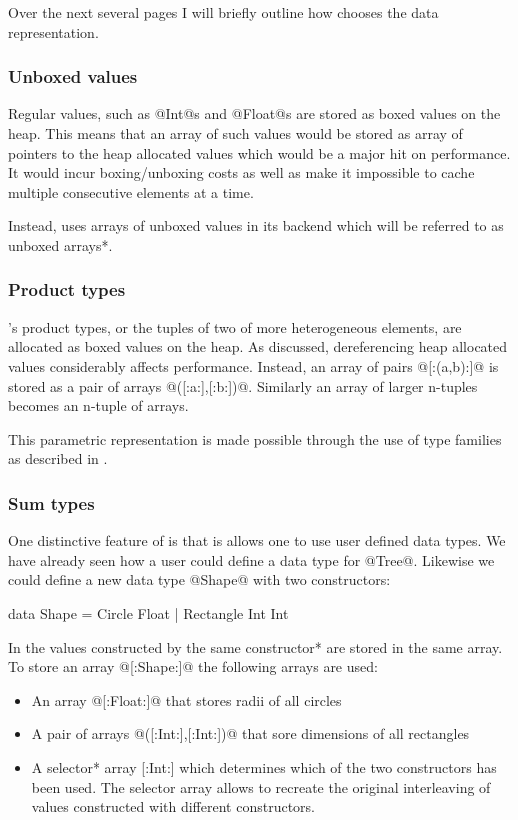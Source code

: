\documentclass[preamble.tex]{subfiles}
\begin{document}
Over the next several pages I will briefly outline how \DPH chooses the data representation.


\subsubsection{Unboxed values}
\iboxing{}

Regular \Haskell values, such as @Int@s and @Float@s are stored as boxed values on the heap. This means that an array of such values would be stored as array of pointers to the heap allocated values which would be a major hit on performance. It would incur boxing/unboxing costs as well as make it impossible to cache multiple consecutive elements at a time.

Instead, \DPH uses arrays of unboxed values in its backend which will be referred to as \*unboxed arrays*.


\subsubsection{Product types}

\Haskell's product types, or the tuples of two of more heterogeneous elements, are allocated as boxed values on the heap. As discussed, dereferencing heap allocated values considerably affects performance. Instead, an array of pairs @[:(a,b):]@ is stored as a pair of arrays @([:a:],[:b:])@. Similarly an array of larger n-tuples becomes an n-tuple of arrays.

This parametric representation is made possible through the use of type families as described in \cite{CDL09}.


\subsubsection{Sum types}

One distinctive feature of \DPH is that is allows one to use user defined data types. We have already seen how a user could define a data type for @Tree@. Likewise we could define a new data type @Shape@ with two constructors:

\begin{hscode}
data Shape = Circle Float
           | Rectangle Int Int
\end{hscode}

In \DPH the values constructed by the \*same constructor* are stored in the same array. To store an array @[:Shape:]@ the following arrays are used:
\begin{itemize}
\item An array @[:Float:]@ that stores radii of all circles
\item A pair of arrays @([:Int:],[:Int:])@ that sore dimensions of all rectangles
\item A \*selector* array [:Int:] which determines which of the two constructors has been used. The selector array allows to recreate the original interleaving of values constructed with different constructors.
\end{itemize}
\end{document}
